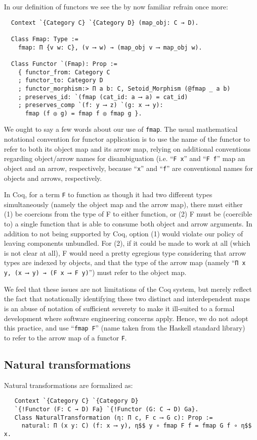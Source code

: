 \documentclass[a4paper,10pt,runningheads]{llncs}
\begin{document}
In our definition of functors we see the by now familiar refrain once more:
\begin{lstlisting}
  Context `{Category C} `{Category D} (map_obj: C → D).

  Class Fmap: Type :=
    fmap: Π {v w: C}, (v ⟶ w) → (map_obj v ⟶ map_obj w).

  Class Functor `(Fmap): Prop :=
    { functor_from: Category C
    ; functor_to: Category D
    ; functor_morphism:> Π a b: C, Setoid_Morphism (@fmap _ a b)
    ; preserves_id: `(fmap (cat_id: a ⟶ a) = cat_id)
    ; preserves_comp `(f: y ⟶ z) `(g: x ⟶ y):
      fmap (f ◎ g) = fmap f ◎ fmap g }.
\end{lstlisting}
We ought to say a few words about our use of \lstinline|fmap|. The usual mathematical notational convention for functor application is to use the name of the functor to refer to both its object map and its arrow map, relying on additional conventions regarding object/arrow names for disambiguation (i.e. ``\lstinline|F x|'' and ``\lstinline|F f|'' map an object and an arrow, respectively, because ``\lstinline|x|'' and ``\lstinline|f|'' are conventional names for objects and arrows, respectively.

In Coq, for a term \lstinline|F| to function as though it had two different types simultaneously (namely the object map and the arrow map), there must either (1) be coercions from the type of F to either function, or (2) F must be (coercible to) a single function that is able to consume both object and arrow arguments. In addition to not being supported by Coq, option (1) would violate our policy of leaving components unbundled. For (2), if it could be made to work at all (which is not clear at all), F would need a pretty egregious type considering that arrow types are indexed by objects, and that the type of the arrow map (namely ``\lstinline|Π x y, (x ⟶ y) → (F x ⟶ F y)|'') must refer to the object map.

We feel that these issues are not limitations of the Coq system, but merely reflect the fact that notationally identifying these two distinct and interdependent maps is an abuse of notation of sufficient severety to make it ill-suited to a formal development where software engineering concerns apply. Hence, we do not adopt this practice, and use ``\lstinline|fmap F|'' (name taken from the Haskell standard library) to refer to the arrow map of a functor \lstinline|F|.

\subsection{Natural transformations}
Natural transformations are formalized as:
\begin{lstlisting}
   Context `{Category C} `{Category D}
   `{!Functor (F: C → D) Fa} `{!Functor (G: C → D) Ga}.
   Class NaturalTransformation (η: Π c, F c ⟶ G c): Prop :=
     natural: Π (x y: C) (f: x ⟶ y), η$$ y ∘ fmap F f = fmap G f ∘ η$$ x.
\end{lstlisting}
\end{document}
